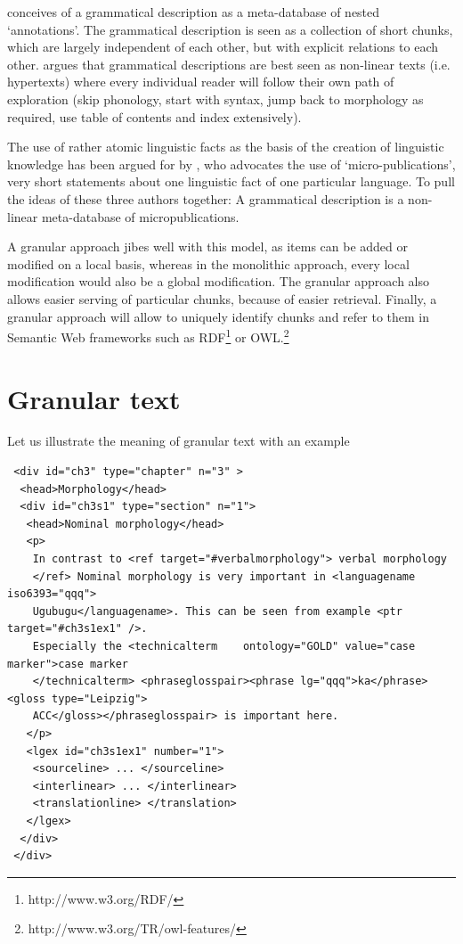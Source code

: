 \documentclass[a4paper,10pt]{article}
\begin{document}
\citet{Good2004} conceives of a grammatical description as a meta-database of nested `annotations'. The grammatical description is seen as a collection of short chunks, which are largely independent of each other, but with explicit relations to each other. \citet{Nordhoff2008jldc} argues that grammatical descriptions are best seen as non-linear texts (i.e. hypertexts) where every individual reader will follow their own path of exploration (skip phonology, start with syntax, jump back to morphology as required, use table of contents and index extensively).

The use of rather atomic linguistic facts as the basis of the creation of linguistic knowledge has been argued for by \citet{Cysouw2009micropub}, who advocates the use of `micro-publications', very short statements about one linguistic fact of one particular language. To pull the ideas of these three authors together: A grammatical description is a non-linear meta-database of micropublications.

A granular approach jibes well with this model, as items can be added or modified on a local basis, whereas in the monolithic approach, every local modification would also be a global modification. The granular approach also allows easier serving of particular chunks, because of easier retrieval. Finally, a granular approach will allow to uniquely identify chunks and refer to them in Semantic Web frameworks such as RDF\footnote{http://www.w3.org/RDF/} or OWL.\footnote{http://www.w3.org/TR/owl-features/}


\section{Granular text}
Let us illustrate the meaning of granular text with an example

\begin{verbatim}
 <div id="ch3" type="chapter" n="3" >
  <head>Morphology</head>
  <div id="ch3s1" type="section" n="1">
   <head>Nominal morphology</head>
   <p>
    In contrast to <ref target="#verbalmorphology"> verbal morphology
    </ref> Nominal morphology is very important in <languagename iso6393="qqq">
    Ugubugu</languagename>. This can be seen from example <ptr target="#ch3s1ex1" />.
    Especially the <technicalterm    ontology="GOLD" value="case marker">case marker
    </technicalterm> <phraseglosspair><phrase lg="qqq">ka</phrase><gloss type="Leipzig">
    ACC</gloss></phraseglosspair> is important here.
   </p>
   <lgex id="ch3s1ex1" number="1">
    <sourceline> ... </sourceline>
    <interlinear> ... </interlinear>
    <translationline> </translation>
   </lgex>
  </div>
 </div>
\end{verbatim}
\end{document}
